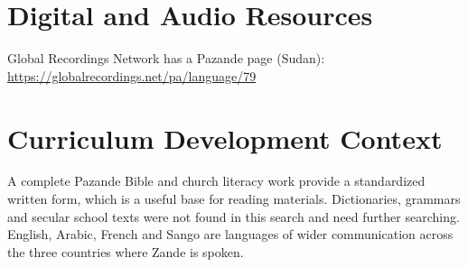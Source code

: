 \documentclass[12pt]{article}
\begin{document}
\section{Digital and Audio Resources}
Global Recordings Network has a Pazande page (Sudan): \url{https://globalrecordings.net/pa/language/79}

\section{Curriculum Development Context}
A complete Pazande Bible and church literacy work provide a standardized written form, which is a useful base for reading materials. Dictionaries, grammars and secular school texts were not found in this search and need further searching. English, Arabic, French and Sango are languages of wider communication across the three countries where Zande is spoken.
\end{document}

